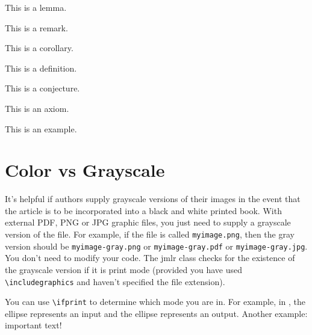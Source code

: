 \documentclass[pmlr,twocolumn,10pt]{jmlr} %
\begin{document}
\begin{lemma}\label{lem:sample}
This is a lemma.
\end{lemma}

\begin{remark}\label{rem:sample}
This is a remark.
\end{remark}

\begin{corollary}\label{cor:sample}
This is a corollary.
\end{corollary}

\begin{definition}\label{def:sample}
This is a definition.
\end{definition}

\begin{conjecture}\label{con:sample}
This is a conjecture.
\end{conjecture}

\begin{axiom}\label{ax:sample}
This is an axiom.
\end{axiom}

\begin{example}[An Example]\label{ex:sample}
This is an example.
\end{example}

\section{Color vs Grayscale}
\label{sec:color}

It's helpful if authors supply grayscale versions of their
images in the event that the article is to be incorporated into
a black and white printed book. With external PDF, PNG or JPG
graphic files, you just need to supply a grayscale version of the
file. For example, if the file is called \texttt{myimage.png},
then the gray version should be \texttt{myimage-gray.png} or
\texttt{myimage-gray.pdf} or \texttt{myimage-gray.jpg}. You don't
need to modify your code. The \textsf{jmlr} class checks for
the existence of the grayscale version if it is print mode 
(provided you have used \verb|\includegraphics| and haven't
specified the file extension).

You can use \verb|\ifprint| to determine which mode you are in.
For example, in , the 
 ellipse represents an input and the
 ellipse represents an output.
Another example: {\ifprint{\bfseries}{\color{red}}important text!}
\end{document}
